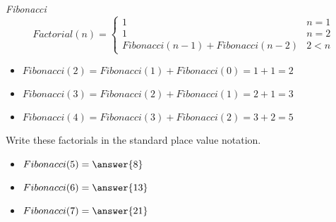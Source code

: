 \documentclass{ximera}
\begin{document}
\begin{example}  \textit{Fibonacci} \\






\[
Factorial(n) = 
\begin{cases}
  1 & n = 1 \\
  1 & n = 2 \\ 
  Fibonacci(n-1) + Fibonacci(n-2) & 2 < n
\end{cases}
\]


\begin{itemize}
\item $Fibonacci(2) = Fibonacci(1) + Fibonacci(0) = 1 + 1 = 2$
\item $Fibonacci(3) = Fibonacci(2) + Fibonacci(1) = 2 + 1 = 3$
\item $Fibonacci(4) = Fibonacci(3) + Fibonacci(2) = 3 + 2 = 5$
\end{itemize}




\begin{question} Write these factorials in the standard place value notation.


\begin{itemize}
\item $Fibonacci(5) = \answer{8}$
\item $Fibonacci(6) = \answer{13}$
\item $Fibonacci(7) = \answer{21}$
\end{itemize}


\end{question}



\end{example}
\end{document}
